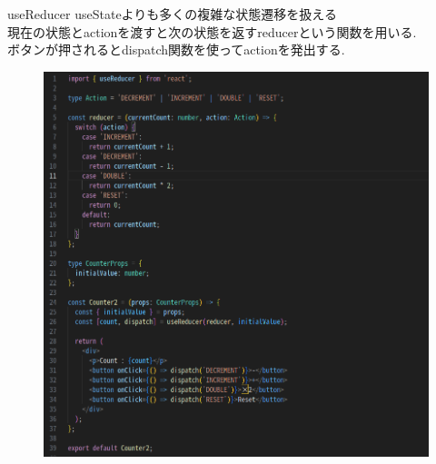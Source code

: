 \documentclass[aspectratio=169]{beamer}
\begin{document}
\begin{frame}[allowframebreaks]{useReducer}
    useStateよりも多くの複雑な状態遷移を扱える\\
    現在の状態とactionを渡すと次の状態を返すreducerという関数を用いる.\\
    ボタンが押されるとdispatch関数を使ってactionを発出する.\\
    \begin{figure}
        \centering
       \includegraphics[scale=0.25]{useReducer.png}
       
    \end{figure}
\end{frame}
\end{document}

